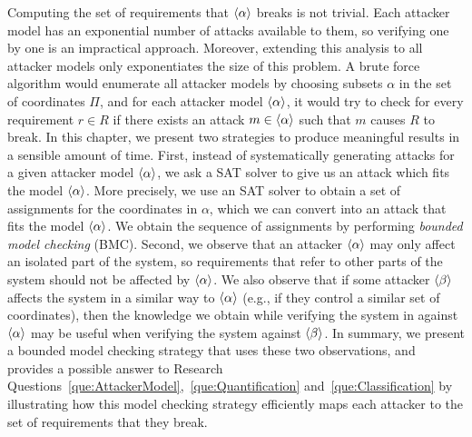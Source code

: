 Computing the set of requirements that ${{\left<\alpha\right>}}$ breaks is not trivial. Each attacker model has an exponential number of attacks available to them, so verifying one by one is an impractical approach. Moreover, extending this analysis to all attacker models only exponentiates the size of this problem. 
A brute force algorithm would enumerate all attacker models by choosing subsets $\alpha$ in the set of coordinates $\Pi$, and for each attacker model ${{\left<\alpha\right>}}$, it would try to check for every requirement $r\in {R}$ if there exists an attack $m\in {{\left<\alpha\right>}}$ such that $m$ causes $R$ to break. %
In this chapter, we present two strategies to produce meaningful results in a sensible amount of time. First, instead of systematically generating attacks for a given attacker model ${{\left<\alpha\right>}}$, we ask a SAT solver to give us an attack which fits the model ${{\left<\alpha\right>}}$. More precisely, we use an SAT solver to obtain a set of assignments for the coordinates in $\alpha$, which we can convert into an attack that fits the model ${{\left<\alpha\right>}}$. 
We obtain the sequence of assignments by performing \emph{bounded model checking} (BMC). Second, we observe that an attacker ${{\left<\alpha\right>}}$ may only affect an isolated part of the system, so requirements that refer to other parts of the system should not be affected by ${{\left<\alpha\right>}}$. We also observe that if some attacker ${{\left<\beta\right>}}$ affects the system in a similar way to ${{\left<\alpha\right>}}$ (e.g., if they control a similar set of coordinates), then the knowledge we obtain while verifying the system in against ${{\left<\alpha\right>}}$ may be useful when verifying the system against ${{\left<\beta\right>}}$. In summary, we present a bounded model checking strategy that uses these two observations, and provides a possible answer to Research Questions~\ref{que:AttackerModel},~\ref{que:Quantification} and~\ref{que:Classification} by illustrating how this model checking strategy efficiently maps each attacker to the set of requirements that they break.




